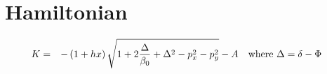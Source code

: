 \documentclass[11pt]{article} %
\begin{document}
\section{Hamiltonian}
%
\begin{eqnarray}K &=
& -\left({1+hx}\right)\sqrt {1+2{\Delta  \over {\beta }_{0}}+{\Delta }^{2}-{p}_{x}^{2}-{p}_{y}^{2}}-A\ \ ~{\rm w}{\rm h}{\rm e}{\rm r}{\rm e}~\Delta =
\delta -\Phi \ \ \ \label{hamptc}\end{eqnarray}
%
\end{document}
